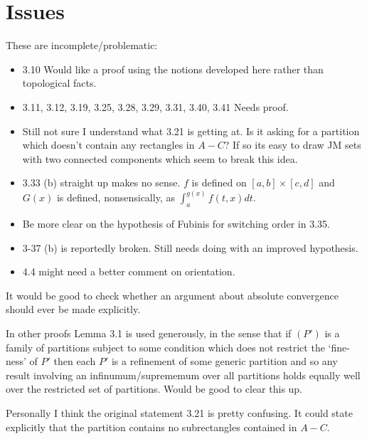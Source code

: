 \documentclass[20pt]{article}
\theoremstyle{plain}
\theoremstyle{definition}
\begin{document}
\section{Issues}



These are incomplete/problematic:
\begin{itemize}
  \item 3.10 Would like a proof using the notions developed here rather than 
  topological facts.
  \item 3.11, 3.12, 3.19, 3.25, 3.28, 3.29, 3.31, 3.40, 3.41 Needs proof.
  \item Still not sure I understand what 3.21 is getting at.  Is it asking for a partition 
  which doesn't contain any rectangles in $A-C$? If so its easy to 
  draw JM sets with two connected components which seem to break this idea.
  \item 3.33 (b) straight up makes no sense. $f$ is defined on $[a, b] \times [c, d]$
  and $G(x)$ is defined, nonsensically, as $\int_a^{g(x)}f(t, x)dt$.
  \item Be more clear on the hypothesis of Fubinis for switching order in 3.35.
  \item 3-37 (b) is reportedly broken. Still needs doing with an improved 
  hypothesis.
  \item 4.4 might need a better comment on orientation.
\end{itemize}

It would be good to check whether an argument about absolute convergence should ever be made explicitly.  

In other proofs Lemma 3.1 is used generously, in the sense that if $(P')$ 
is a family of partitions subject to some condition which does not restrict the
`fine-ness' of $P'$
then each $P'$ is a refinement of some generic partition and so any result 
involving an infinumum/suprememum over all partitions holds equally well over
the restricted set of partitions.  Would be good to clear this up.

Personally I think the original statement 3.21 is pretty confusing.  It could 
state explicitly that the partition contains no subrectangles contained in $A-C.$
\vspace{3em}
\end{document}
